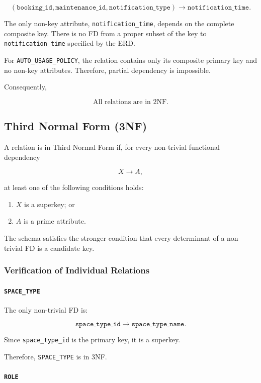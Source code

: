 \[
(\texttt{booking\_id},\texttt{maintenance\_id},
\texttt{notification\_type})
\rightarrow
\texttt{notification\_time}.
\]

The only non-key attribute, \texttt{notification\_time}, depends on the
complete composite key. There is no FD from a proper subset of the key
to \texttt{notification\_time} specified by the ERD.

For \texttt{AUTO\_USAGE\_POLICY}, the relation contains only its
composite primary key and no non-key attributes. Therefore, partial
dependency is impossible.

Consequently,

\[
\boxed{\text{All relations are in 2NF.}}
\]

\subsection{Third Normal Form (3NF)}

A relation is in Third Normal Form if, for every non-trivial functional
dependency

\[
X \rightarrow A,
\]

at least one of the following conditions holds:

\begin{enumerate}
    \item $X$ is a superkey; or
    \item $A$ is a prime attribute.
\end{enumerate}

The schema satisfies the stronger condition that every determinant of
a non-trivial FD is a candidate key.

\subsubsection{Verification of Individual Relations}

\paragraph{\texttt{SPACE\_TYPE}}

The only non-trivial FD is:

\[
\texttt{space\_type\_id}
\rightarrow
\texttt{space\_type\_name}.
\]

Since \texttt{space\_type\_id} is the primary key, it is a superkey.

Therefore, \texttt{SPACE\_TYPE} is in 3NF.

\paragraph{\texttt{ROLE}}

